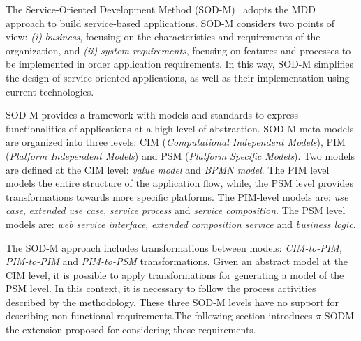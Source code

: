 
The Service-Oriented Development Method (SOD-M)~\cite{decastro1}
adopts  the MDD approach to build service-based applications. SOD-M considers two points of view:
\textit{(i)} \textit{business}, focusing on the characteristics and requirements
of the organization, and \textit{(ii)} \textit{system requirements}, focusing on
features and processes to be implemented in order application requirements. In
this way, SOD-M  simplifies the design of service-oriented applications, as
well as their implementation using current technologies.

SOD-M provides a framework with models and standards to express functionalities
of applications at a high-level of abstraction. SOD-M meta-models are organized 
into three levels: CIM (\textit{Computational Independent Models}), 
PIM (\textit{Platform Independent Models}) and PSM (\textit{Platform Specific Models}).
Two models are defined at the CIM level: \textit{value model} 
and \textit{BPMN model}. 
The PIM level models the entire structure of the application flow,
while, the PSM level provides transformations towards more specific platforms.
The PIM-level models are: \textit{use case}, \textit{extended use case}, \textit{service process} and
\textit{service composition}. The PSM level models are: \textit{web service interface}, \textit{extended composition service} and \textit{business logic}. 
 

The SOD-M approach includes transformations between models:
\textit{CIM-to-PIM, PIM-to-PIM} and \textit{PIM-to-PSM} transformations. Given
an abstract model at the CIM level, it is possible to apply transformations for
generating a model of the PSM level. In this context, it is necessary to
follow the process activities described by the methodology. 
%
These three SOD-M levels have no support for describing non-functional requirements.The following section introduces $\pi$-SODM the extension proposed for considering these requirements.



